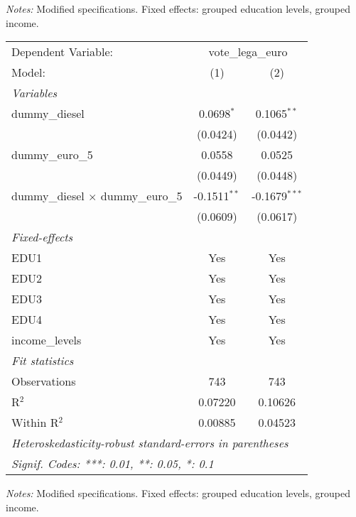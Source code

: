 \par \raggedright 
\textit{Notes:} Modified specifications. Fixed effects: grouped education levels, grouped income.
\par\endgroup



\begingroup
\centering
\begin{tabular}{lcc}
   \tabularnewline \midrule \midrule
   Dependent Variable: & \multicolumn{2}{c}{vote\_lega\_euro}\\
   Model:                                    & (1)            & (2)\\  
   \midrule
   \emph{Variables}\\
   dummy\_diesel                             & 0.0698$^{*}$   & 0.1065$^{**}$\\   
                                             & (0.0424)       & (0.0442)\\   
   dummy\_euro\_5                            & 0.0558         & 0.0525\\   
                                             & (0.0449)       & (0.0448)\\   
   dummy\_diesel $\times$ dummy\_euro\_5     & -0.1511$^{**}$ & -0.1679$^{***}$\\   
                                             & (0.0609)       & (0.0617)\\   
   \midrule
   \emph{Fixed-effects}\\
   EDU1                                      & Yes            & Yes\\  
   EDU2                                      & Yes            & Yes\\  
   EDU3                                      & Yes            & Yes\\  
   EDU4                                      & Yes            & Yes\\  
   income\_levels                            & Yes            & Yes\\  
   \midrule
   \emph{Fit statistics}\\
   Observations                              & 743            & 743\\  
   R$^2$                                     & 0.07220        & 0.10626\\  
   Within R$^2$                              & 0.00885        & 0.04523\\  
   \midrule \midrule
   \multicolumn{3}{l}{\emph{Heteroskedasticity-robust standard-errors in parentheses}}\\
   \multicolumn{3}{l}{\emph{Signif. Codes: ***: 0.01, **: 0.05, *: 0.1}}\\
\end{tabular}
 
\par \raggedright 
\textit{Notes:} Modified specifications. Fixed effects: grouped education levels, grouped income.
\par\endgroup


